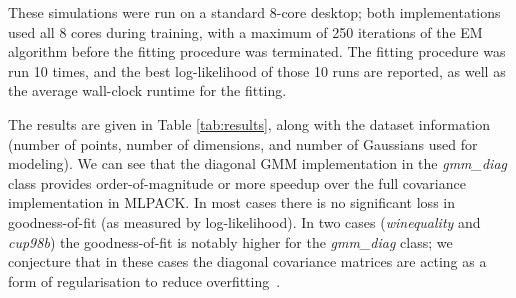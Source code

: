 These simulations were run on a standard 8-core desktop; both implementations
used all 8 cores during training, with a maximum of 250 iterations of the EM
algorithm before the fitting procedure was terminated.  The fitting procedure
was run 10 times, and the best log-likelihood of those 10 runs are reported,
as well as the average wall-clock runtime for the fitting.

The results are given in Table \ref{tab:results}, along with the dataset
information (number of points, number of dimensions, and number of Gaussians
used for modeling).  We can see that the diagonal GMM implementation in 
the {\it gmm\_diag} class provides order-of-magnitude or more speedup over the full covariance
implementation in MLPACK.
In most cases there is no significant loss in goodness-of-fit (as measured by log-likelihood).
In two cases ({\it winequality} and {\it cup98b}) the goodness-of-fit is notably higher for the {\it gmm\_diag} class;
we conjecture that in these cases the diagonal covariance matrices are acting as a form of regularisation to reduce overfitting~\cite{Bishop_2006}.



